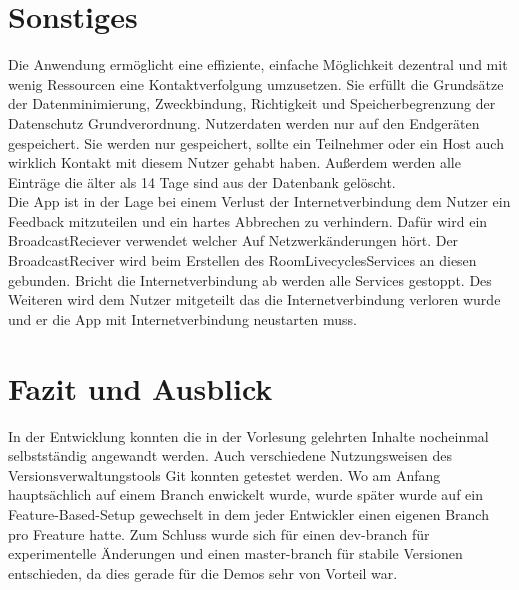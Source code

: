 \section{Sonstiges} 
\label{sec:sonstiges}
Die Anwendung ermöglicht eine effiziente, einfache Möglichkeit dezentral und mit wenig Ressourcen eine Kontaktverfolgung umzusetzen.
Sie erfüllt die Grundsätze der Datenminimierung, Zweckbindung, Richtigkeit und Speicherbegrenzung der Datenschutz Grundverordnung. Nutzerdaten werden nur auf den Endgeräten gespeichert. 
Sie werden nur gespeichert, sollte ein Teilnehmer oder ein Host auch wirklich Kontakt mit diesem Nutzer gehabt haben. 
Außerdem werden alle Einträge die älter als 14 Tage sind aus der Datenbank gelöscht.\\
Die App ist in der Lage bei einem Verlust der Internetverbindung dem Nutzer ein Feedback mitzuteilen und ein hartes Abbrechen zu verhindern. 
Dafür wird ein BroadcastReciever verwendet welcher Auf Netzwerkänderungen hört. 
Der BroadcastReciver wird beim Erstellen des RoomLivecyclesServices an diesen gebunden.
 Bricht die Internetverbindung ab werden alle Services gestoppt. 
Des Weiteren wird dem Nutzer mitgeteilt das die Internetverbindung verloren wurde und er die App mit Internetverbindung neustarten muss.

\section{Fazit und Ausblick}
\label{sec:FuA}

In der Entwicklung konnten die in der Vorlesung gelehrten Inhalte nocheinmal selbstständig angewandt werden. 
Auch verschiedene Nutzungsweisen des Versionsverwaltungstools Git konnten getestet werden. 
Wo am Anfang hauptsächlich auf einem Branch enwickelt wurde, wurde später wurde auf ein Feature-Based-Setup gewechselt in dem jeder Entwickler einen eigenen Branch pro Freature hatte.
Zum Schluss wurde sich für einen dev-branch für experimentelle Änderungen und einen master-branch für stabile Versionen entschieden, da dies gerade für die Demos sehr von Vorteil war. 


